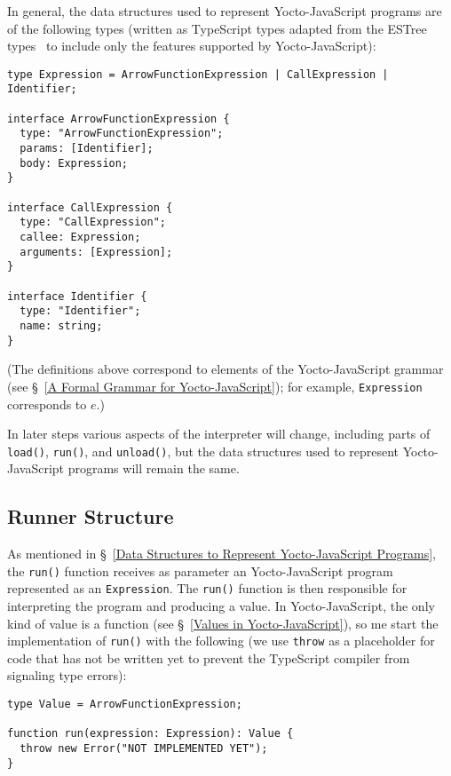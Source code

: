 \documentclass[12pt, oneside]{book}
\begin{document}
In general, the data structures used to represent Yocto-JavaScript programs are of the following types (written as TypeScript types adapted from the ESTree types~\cite{estree-types} to include only the features supported by Yocto-JavaScript):

\begin{verbatim}
type Expression = ArrowFunctionExpression | CallExpression | Identifier;

interface ArrowFunctionExpression {
  type: "ArrowFunctionExpression";
  params: [Identifier];
  body: Expression;
}

interface CallExpression {
  type: "CallExpression";
  callee: Expression;
  arguments: [Expression];
}

interface Identifier {
  type: "Identifier";
  name: string;
}
\end{verbatim}

(The definitions above correspond to elements of the Yocto-JavaScript grammar (see §~\ref{A Formal Grammar for Yocto-JavaScript}); for example, \texttt{Expression} corresponds to $e$.)

In later steps various aspects of the interpreter will change, including parts of \texttt{load()}, \texttt{run()}, and \texttt{unload()}, but the data structures used to represent Yocto-JavaScript programs will remain the same.

\subsection{Runner Structure}
\label{Runner Structure}

As mentioned in §~\ref{Data Structures to Represent Yocto-JavaScript Programs}, the \texttt{run()} function receives as parameter an Yocto-JavaScript program represented as an \texttt{Expression}. The \texttt{run()} function is then responsible for interpreting the program and producing a value. In Yocto-JavaScript, the only kind of value is a function (see §~\ref{Values in Yocto-JavaScript}), so me start the implementation of \texttt{run()} with the following (we use \texttt{throw} as a placeholder for code that has not be written yet to prevent the TypeScript compiler from signaling type errors):

\begin{verbatim}
type Value = ArrowFunctionExpression;

function run(expression: Expression): Value {
  throw new Error("NOT IMPLEMENTED YET");
}
\end{verbatim}
\end{document}
